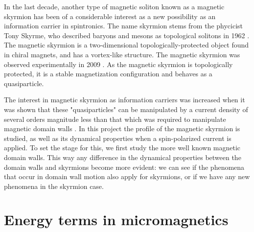 \documentclass[12pt, a4paper, twoside, openright]{article}		%
\let\oldsection\section
\def\section{\cleardoublepage\oldsection}
\numberwithin{equation}{section}
\begin{document}
In the last decade, another type of magnetic soliton known as a magnetic skyrmion has been of a considerable interest as a new possibility as an information carrier in spintronics. The name skyrmion stems from the phycicist Tony Skyrme, who described baryons and mesons as topological solitons in 1962 \cite{Skyrme1962}. The magnetic skyrmion is a two-dimensional topologically-protected object found in chiral magnets, and has a vortex-like structure. The magnetic skyrmion was observed experimentally in 2009 \cite{Muhlbauer2009}. As the magnetic skyrmion is topologically protected, it is a stable magnetization configuration and behaves as a quasiparticle. 

The interest in magnetic skyrmion as information carriers was increased when it was shown that these "quasiparticles" can be manipulated by a current density of several orders magnitude less than that which was required to manipulate magnetic domain walls \cite{Jonietz2010}. In this project the profile of the magnetic skyrmion is studied, as well as its dynamical properties when a spin-polarized current is applied. To set the stage for this, we first study the more well known magnetic domain walls. This way any difference in the dynamical properties between the domain walls and skyrmions become more evident: we can see if the phenomena that occur in domain wall motion also apply for skyrmions, or if we have any new phenomena in the skyrmion case.

\section{Energy terms in micromagnetics}\label{sec:MicromagneticEnergy}
\end{document}
